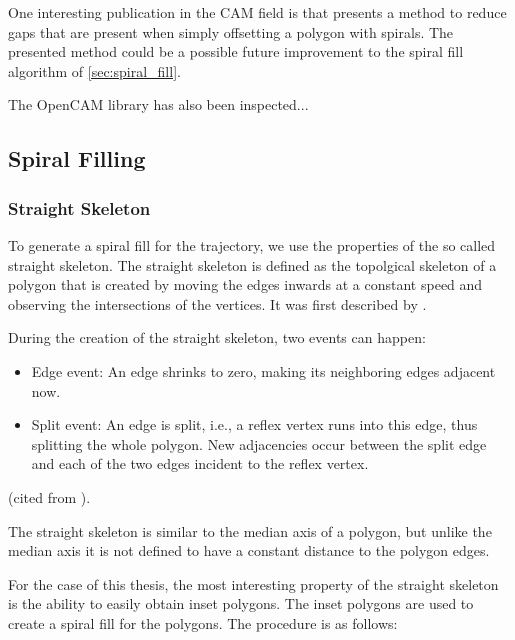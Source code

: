One interesting publication in the CAM field is \cite{kao1998optimal} that presents a method to reduce gaps that are present when simply offsetting a polygon with spirals. The presented method could be a possible future improvement to the spiral fill algorithm of \autoref{sec:spiral_fill}.

The OpenCAM library has also been inspected...

\subsection{Spiral Filling}

\subsubsection{Straight Skeleton}

To generate a spiral fill for the trajectory, we use the properties of the so called straight skeleton. The straight skeleton is defined as the topolgical skeleton of a polygon that is created by moving the edges inwards at a constant speed and observing the intersections of the vertices. It was first described by \citep{Aichholzer:jucs_1_12:a_novel_type_of}. 

During the creation of the straight skeleton, two events can happen: 

\begin{itemize}
\item Edge event: An edge shrinks to zero, making its neighboring edges adjacent now.
\item Split event: An edge is split, i.e., a reflex vertex runs into this edge, thus splitting the whole polygon. New adjacencies occur between the split edge and each of the two edges incident to the reflex vertex.
\end{itemize}
(cited from \citep{Aichholzer:jucs_1_12:a_novel_type_of}).

The straight skeleton is similar to the median axis of a polygon, but unlike the median axis it is not defined to have a constant distance to the polygon edges.

For the case of this thesis, the most interesting property of the straight skeleton is the ability to easily obtain inset polygons. The inset polygons are used to create a spiral fill for the polygons. The procedure is as follows:

